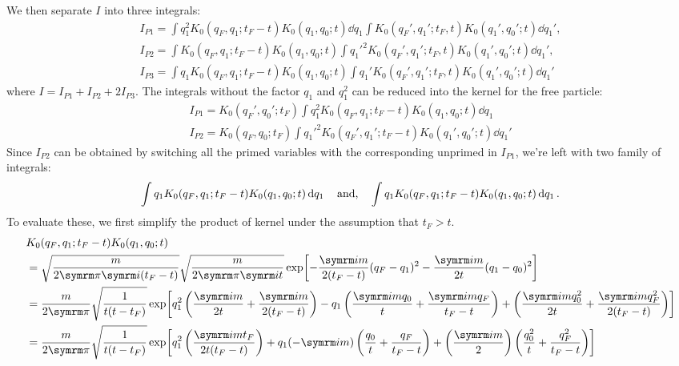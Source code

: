 We then separate $I$ into three integrals:
\begin{gather}
    I_{P1} = \int q_1^2K_0(q_F, q_1; t_F - t)K_0(q_1, q_0; t)\dd{q_1} \int K_0(q_F', q_1'; t_F, t)K_0(q_1', q_0'; t)\dd{q_1'}, \label{eq:spring_IP1}\\
    I_{P2} = \int K_0(q_F, q_1; t_F - t)K_0(q_1, q_0; t) \int q_1'^2K_0(q_F', q_1'; t_F, t)K_0(q_1', q_0'; t)\dd{q_1'}, \label{eq:spring_IP2}\\
    I_{P3} = \int q_1K_0(q_F, q_1; t_F - t)K_0(q_1, q_0; t) \int q_1'K_0(q_F', q_1'; t_F, t)K_0(q_1', q_0'; t) \dd{q_1'} \label{eq:spring_IP3}
\end{gather}
where $I = I_{P1} + I_{P2} + 2I_{P3}$. The integrals without the factor $q_1$ and $q_1^2$ can be reduced into the kernel for the free particle:
\begin{gather}
    I_{P1} = K_0(q_F', q_0'; t_F)\int q_1^2K_0(q_F, q_1; t_F - t)K_0(q_1, q_0; t)\dd{q_1} \\
    I_{P2} = K_0(q_F, q_0; t_F)\int q_1'^2 K_0(q_F', q_1'; t_F - t)K_0(q_1', q_0'; t)\dd{q_1'}
\end{gather}
Since $I_{P2}$ can be obtained by switching all the primed variables with the corresponding unprimed in $I_{P1}$, we're left with two family of integrals:
\begin{equation}
    \int q_1K_0(q_F, q_1; t_F - t)K_0(q_1, q_0; t)\dd{q_1} \quad\textrm{and,}\quad \int q_1K_0(q_F, q_1; t_F - t)K_0(q_1, q_0; t)\dd{q_1}. \label{eq:spring_family_of_integrals}
\end{equation}
To evaluate these, we first simplify the product of kernel under the assumption that $t_F > t$.
\begin{align}
    &K_0(q_F, q_1; t_F - t)K_0(q_1, q_0; t) \nonumber\\
    &= \sqrt{\frac{m}{2\cpi\im(t_F - t)}}\sqrt{\frac{m}{2\cpi\im t}}\exp[-\frac{\im m}{2(t_F - t)}(q_F - q_1)^2 - \frac{\im m}{2t}(q_1 - q_0)^2] \\
    &= \frac{m}{2\cpi}\sqrt{\frac{1}{t(t - t_F)}} \exp[q_1^2\left(\frac{\im m}{2t} + \frac{\im m}{2(t_F - t)}\right) - q_1\left(\frac{\im m q_0}{t} + \frac{\im m q_F}{t_F - t}\right) + \left(\frac{\im m q_0^2}{2t} + \frac{\im m q_F^2}{2(t_F - t)}\right)] \nonumber \\
    &= \frac{m}{2\cpi}\sqrt{\frac{1}{t(t - t_F)}} \exp[q_1^2\left(\frac{\im m t_F}{2t(t_F - t)}\right) + q_1(-\im m)\left(\frac{q_0}{t} + \frac{q_F}{t_F - t}\right) + \left(\frac{\im m}{2}\right)\left(\frac{q_0^2}{t} + \frac{q_F^2}{t_F - t}\right)] \nonumber
\end{align}
